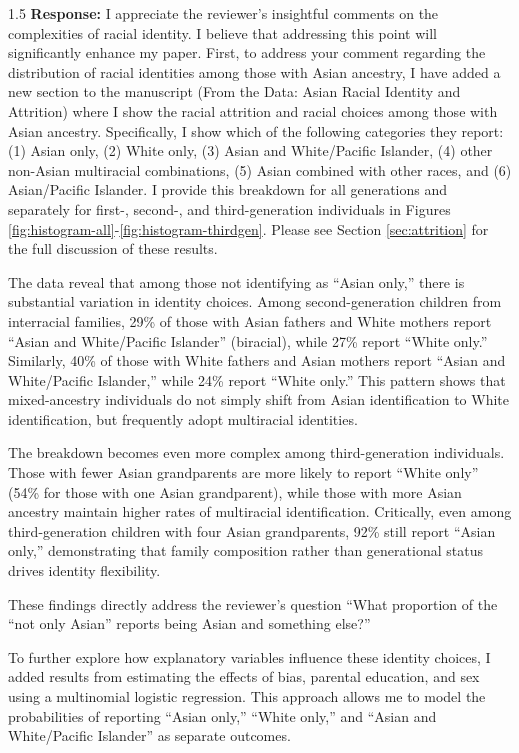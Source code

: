 \documentclass[12pt,english]{article}
\newcommand{\rrxspc}{1.5}
\begin{document}
\begin{refsection}
        \begin{spacing}{\rrxspc}
            \textbf{Response:} I appreciate the reviewer's insightful comments on the complexities of racial identity. I believe that addressing this point will significantly enhance my paper. First, to address your comment regarding the distribution of racial identities among those with Asian ancestry, I have added a new section to the manuscript (From the Data: Asian Racial Identity and Attrition) where I show the racial attrition and racial choices among those with Asian ancestry. Specifically, I show which of the following categories they report: (1) Asian only, (2) White only, (3) Asian and White/Pacific Islander, (4) other non-Asian multiracial combinations, (5) Asian combined with other races, and (6) Asian/Pacific Islander. I provide this breakdown for all generations and separately for first-, second-, and third-generation individuals in Figures \ref{fig:histogram-all}-\ref{fig:histogram-thirdgen}. Please see Section \ref{sec:attrition} for the full discussion of these results. 

            The data reveal that among those not identifying as ``Asian only,'' there is substantial variation in identity choices. Among second-generation children from interracial families, 29\% of those with Asian fathers and White mothers report ``Asian and White/Pacific Islander'' (biracial), while 27\% report ``White only.'' Similarly, 40\% of those with White fathers and Asian mothers report ``Asian and White/Pacific Islander,'' while 24\% report ``White only.'' This pattern shows that mixed-ancestry individuals do not simply shift from Asian identification to White identification, but frequently adopt multiracial identities.

            The breakdown becomes even more complex among third-generation individuals. Those with fewer Asian grandparents are more likely to report ``White only'' (54\% for those with one Asian grandparent), while those with more Asian ancestry maintain higher rates of multiracial identification. Critically, even among third-generation children with four Asian grandparents, 92\% still report ``Asian only,'' demonstrating that family composition rather than generational status drives identity flexibility.

            These findings directly address the reviewer's question ``What proportion of the “not only Asian” reports being Asian and something else?'' 

            To further explore how explanatory variables influence these identity choices, I added results from estimating the effects of bias, parental education, and sex using a multinomial logistic regression. This approach allows me to model the probabilities of reporting ``Asian only,'' ``White only,'' and ``Asian and White/Pacific Islander'' as separate outcomes.


\end{spacing}
\end{refsection}
\end{document}
